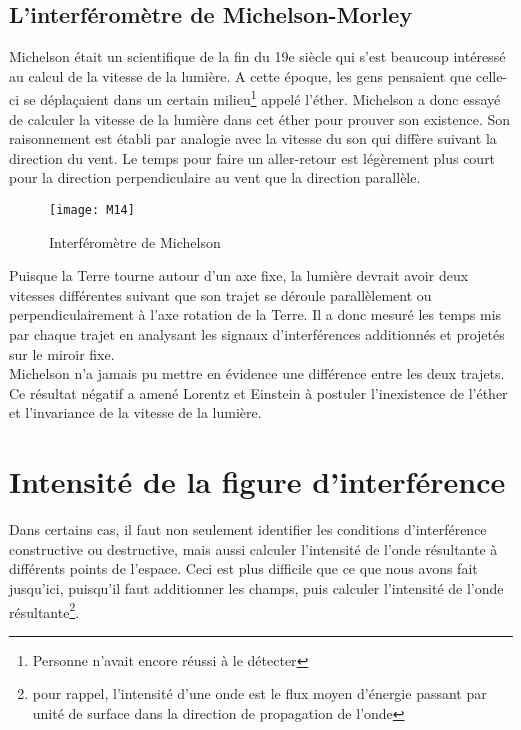 \subsection{L'interféromètre de Michelson-Morley}

Michelson était un scientifique de la fin du 19e siècle qui s'est beaucoup intéressé au calcul de la vitesse de la lumière. A cette époque, les gens pensaient que celle-ci se déplaçaient dans un certain milieu\footnote{Personne n'avait encore réussi à le détecter} appelé l'éther. Michelson a donc essayé de calculer la vitesse de la lumière dans cet éther pour prouver son existence. Son raisonnement est établi par analogie avec la vitesse du son qui diffère suivant la direction du vent. Le temps pour faire un aller-retour est légèrement plus court pour la direction perpendiculaire au vent que la direction parallèle. 

\begin{figure}[htb]
\centering
\texttt{[image: M14]}
\caption{Interféromètre de Michelson}
\label{fig:Michelson}
\end{figure}

Puisque la Terre tourne autour d'un axe fixe, la lumière devrait avoir deux vitesses différentes suivant que son trajet se déroule parallèlement ou perpendiculairement à l'axe rotation de la Terre.  Il a donc mesuré les temps mis par chaque trajet en analysant les signaux d'interférences additionnés et projetés sur le miroir fixe.\\

Michelson n'a jamais pu mettre en évidence une différence entre les deux trajets. Ce résultat négatif a amené Lorentz et Einstein à postuler l'inexistence de l'éther et l'invariance de la vitesse de la lumière.






\section{Intensité de la figure d'interférence}

Dans certains cas, il faut non seulement identifier les conditions d'interférence constructive ou destructive, mais aussi calculer l'intensité de l'onde résultante à différents points de l'espace. Ceci est plus difficile que ce que nous avons fait jusqu'ici, puisqu'il faut additionner les champs, puis calculer l'intensité de l'onde résultante\footnote{pour rappel, l'intensité d'une onde est le flux moyen d'énergie passant par unité de surface dans la direction de propagation de l'onde}.\\

